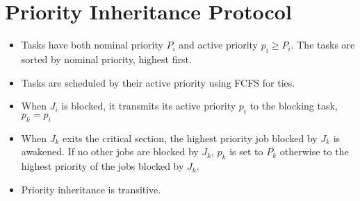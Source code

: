 \section{Priority Inheritance Protocol}
\begin{itemize}
	\item Tasks have both nominal priority $P_i$ and active priority $p_i \geq P_i$.
		The tasks are sorted by nominal priority, highest first.
	\item Tasks are scheduled by their active priority using FCFS for ties.
	\item When $J_i$ is blocked, it transmits its active priority $p_i$ to the
		blocking task, $p_k = p_i$
	\item When $J_k$ exits the critical section, the highest priority job
		blocked by $J_k$ is awakened. If no other jobs are blocked by $J_k$,
		$p_k$ is set to $P_k$ otherwise to the highest priority of the jobs
		blocked by $J_k$.
	\item Priority inheritance is transitive.
\end{itemize}
